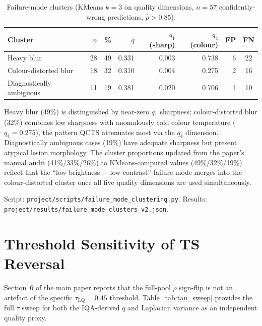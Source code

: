 \documentclass{bmvc2k}
\newcommand{\qbar}{\bar{q}}
\begin{document}
\begin{table}[h]
\centering
\caption{Failure-mode clusters (KMeans $k{=}3$ on quality dimensions, $n{=}57$ confidently-wrong predictions, $\hat p{>}0.85$).}
\label{tab:failure_clusters}
\footnotesize
\begin{tabular}{lrrrrrrc}
\toprule
Cluster & $n$ & \% & $\bar{q}$ & $q_1$ (sharp) & $q_4$ (colour) & FP & FN \\
\midrule
Heavy blur      & 28 & 49 & 0.331 & 0.003 & 0.738 & 6  & 22 \\
Colour-distorted blur & 18 & 32 & 0.310 & 0.004 & 0.275 & 2  & 16 \\
Diagnostically ambiguous & 11 & 19 & 0.381 & 0.020 & 0.706 & 1  & 10 \\
\bottomrule
\end{tabular}
\end{table}

Heavy blur (49\%) is distinguished by near-zero $q_1$ sharpness; colour-distorted blur (32\%) combines low sharpness with anomalously cold colour temperature ($q_4{=}0.275$), the pattern QCTS attenuates most via the $q_4$ dimension. Diagnostically ambiguous cases (19\%) have adequate sharpness but present atypical lesion morphology. The cluster proportions updated from the paper's manual audit (41\%/33\%/26\%) to KMeans-computed values (49\%/32\%/19\%) reflect that the ``low brightness + low contrast'' failure mode merges into the colour-distorted cluster once all five quality dimensions are used simultaneously.

Script: \texttt{project/scripts/failure\_mode\_clustering.py}.
Results: \texttt{project/results/failure\_mode\_clusters\_v2.json}.

\section{Threshold Sensitivity of TS Reversal}
\label{app:threshold_sensitivity}

Section~6 of the main paper reports that the full-pool $\rho$ sign-flip is not an artefact of the specific $\tau_\text{LQ}{=}0.45$ threshold. Table~\ref{tab:tau_sweep} provides the full $\tau$ sweep for both the IQA-derived $\qbar$ and Laplacian variance as an independent quality proxy.
\end{document}
